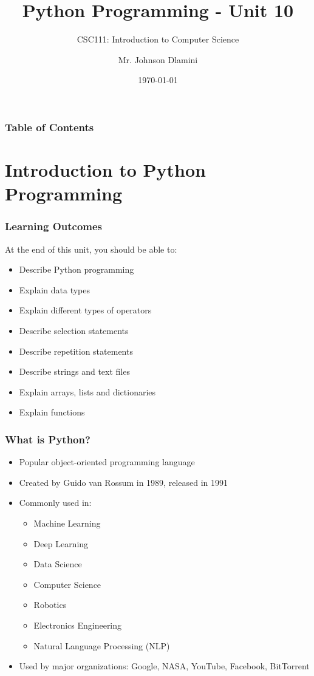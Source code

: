 \documentclass[aspectratio=169]{beamer}
\title[University of Eswatini]{Python Programming - Unit 10}
\subtitle{CSC111: Introduction to Computer Science}
\author[J.S.D]{Mr. Johnson Dlamini}
\institute[jsdlamini@uniswa.sz]{The University of Eswatini}
\date{\today}
\begin{document}
\frame{\titlepage}

\begin{frame}
\frametitle{Table of Contents}
\tableofcontents
\end{frame}

\section{Introduction to Python Programming}

\begin{frame}
\frametitle{Learning Outcomes}
At the end of this unit, you should be able to:
\begin{itemize}
\item Describe Python programming
\item Explain data types
\item Explain different types of operators
\item Describe selection statements
\item Describe repetition statements
\item Describe strings and text files
\item Explain arrays, lists and dictionaries
\item Explain functions
\end{itemize}
\end{frame}

\begin{frame}
\frametitle{What is Python?}
\begin{itemize}
\item Popular object-oriented programming language
\item Created by Guido van Rossum in 1989, released in 1991
\item Commonly used in:
    \begin{itemize}
    \item Machine Learning
    \item Deep Learning
    \item Data Science
    \item Computer Science
    \item Robotics
    \item Electronics Engineering
    \item Natural Language Processing (NLP)
    \end{itemize}
\item Used by major organizations: Google, NASA, YouTube, Facebook, BitTorrent
\end{itemize}
\end{frame}
\end{document}
